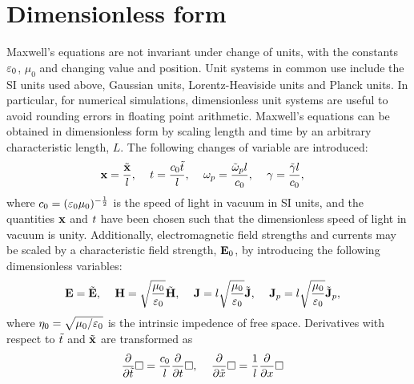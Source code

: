 \section{Dimensionless form}
Maxwell's equations are not invariant under change of units, with the constants
$\varepsilon_0$, $\mu_0$ and changing value and position. Unit systems in common use
include the SI units used above, Gaussian units, Lorentz-Heaviside units and
Planck units. In particular, for numerical simulations, dimensionless unit
systems are useful to avoid rounding errors in floating point arithmetic. Maxwell's equations can be obtained in dimensionless form by scaling length and
time by an arbitrary characteristic length, $L$. The following changes of
variable are introduced:
\begin{align}
  \label{eq:dimensionless-scaling-1}
  \mathbf{x} &= \frac{\tilde{\mathbf{x}}}{l}, &  \
                                        t &= \frac{c_0 \tilde{t}}{l}, &  \
                                                                                \omega_p &= \frac{\tilde{\omega}_p l}{c_0}, & \
                                                                                                                                       \gamma &= \frac{\tilde{\gamma} l}{c_0},
\end{align}
where $c_0 = ( \varepsilon_0 \mu_0 )^{-\frac{1}{2}}$ is the speed of light in vacuum
in SI units, and the quantities $\mathbf{x}$ and $t$ have been chosen such that the
dimensionless speed of light in vacuum is unity. Additionally, electromagnetic
field strengths and currents may be scaled by a characteristic field strength,
$\mathbf{E}_0$, by introducing the following dimensionless variables:
\begin{align}
  \label{eq:dimensionless-scaling-2}
  \mathbf{E} &= \tilde{\mathbf{E}}, &  \
                   \mathbf{H} &= \sqrt{\frac{\mu_0}{\varepsilon_0}} \tilde{\mathbf{H}}, &  \
                                              \mathbf{J} &= l \sqrt{\frac{\mu_0}{\varepsilon_0}} \tilde{\mathbf{J}}, & \
                                                                                  \mathbf{J}_p &= l \sqrt{\frac{\mu_0}{\varepsilon_0}} \tilde{\mathbf{J}}_p,
\end{align}
where $\eta_0 = \sqrt{\mu_0 / \varepsilon_0}$ is the intrinsic impedence of free space. Derivatives with respect to $\tilde{t}$ and $\tilde{\mathbf{x}}$ are transformed as
\begin{align}
  \label{eq:dimensionless-scaling-3}
  \frac{\partial}{\partial \tilde{t} } \Box &= \frac{c_0}{l}\frac{\partial}{\partial t} \Box, & \
                                                                \frac{\partial}{\partial \tilde{x}} \Box &= \frac{1}{l}\frac{\partial}{\partial x} \Box
\end{align}
